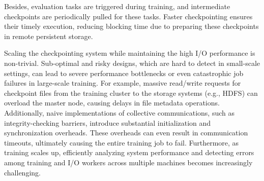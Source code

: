 Besides, evaluation tasks are triggered during training, and intermediate checkpoints are periodically pulled for these tasks.
Faster checkpointing ensures their timely execution, reducing blocking time due to preparing these checkpoints in remote persistent storage. 

Scaling the checkpointing system while maintaining the high I/O performance is non-trivial.
Sub-optimal and risky designs, which are hard to detect in small-scale settings, can lead to severe performance bottlenecks or even catastrophic job failures in large-scale training.
For example, massive read/write requests for checkpoint files from the training cluster to the storage systems (e.g., HDFS) can overload the master node, causing delays in file metadata operations.
Additionally, naive implementations of collective communications, such as integrity-checking barriers, introduce substantial initialization and synchronization overheads.
These overheads can even result in communication timeouts, ultimately causing the entire training job to fail.
Furthermore, as training scales up, efficiently analyzing system performance and detecting errors among training and I/O workers across multiple machines becomes increasingly challenging.

